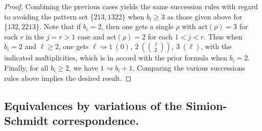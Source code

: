 \documentclass[11pt]{amsart}
\theoremstyle{plain}
\theoremstyle{definition}
\begin{document}
\begin{proof}
Combining the previous cases yields the same succession rules with regard to avoiding the pattern
set $\{213,1322\}$ when $b_i \geq 3$ as those given above for $\{132,2213\}$.  Note that if $b_i=2$,
then one gets a single $\rho$ with $\text{act}(\rho)=3$ for each $r$ in the $j=r>1$ case and
$\text{act}(\rho)=2$ for each  $1<j<r$.  Thus when $b_i=2$ and $\ell \geq 2$, one gets $\ell
\rightsquigarrow 1~(0),~2~(\binom{\ell}{2}),~3~(\ell)$, with the indicated multiplicities, which is
in accord with the prior formula when $b_i=2$.  Finally, for all $b_i \geq 2$, we have
$1\rightsquigarrow b_i+1$.  Comparing the various successions rules above implies the desired result.
\end{proof}

\subsection{Equivalences by variations of the Simion-Schmidt correspondence.}
\end{document}
